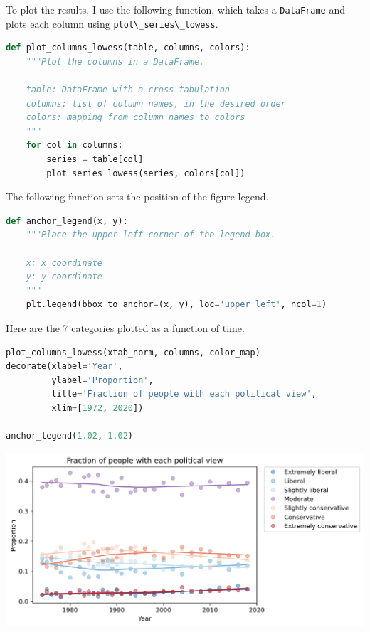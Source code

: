 To plot the results, I use the following function, which takes a
\passthrough{\lstinline!DataFrame!} and plots each column using
\passthrough{\lstinline!plot\_series\_lowess!}.

\begin{lstlisting}[language=Python,style=source]
def plot_columns_lowess(table, columns, colors):
    """Plot the columns in a DataFrame.
    
    table: DataFrame with a cross tabulation
    columns: list of column names, in the desired order
    colors: mapping from column names to colors
    """
    for col in columns:
        series = table[col]
        plot_series_lowess(series, colors[col])
\end{lstlisting}

The following function sets the position of the figure legend.

\begin{lstlisting}[language=Python,style=source]
def anchor_legend(x, y):
    """Place the upper left corner of the legend box.
    
    x: x coordinate
    y: y coordinate
    """
    plt.legend(bbox_to_anchor=(x, y), loc='upper left', ncol=1)
\end{lstlisting}

Here are the 7 categories plotted as a function of time.

\begin{lstlisting}[language=Python,style=source]
plot_columns_lowess(xtab_norm, columns, color_map)
decorate(xlabel='Year',
         ylabel='Proportion',
         title='Fraction of people with each political view',
         xlim=[1972, 2020])

anchor_legend(1.02, 1.02)
\end{lstlisting}

\begin{center}
\includegraphics[scale=0.75]{02_polviews_files/02_polviews_87_0.png}
\end{center}

